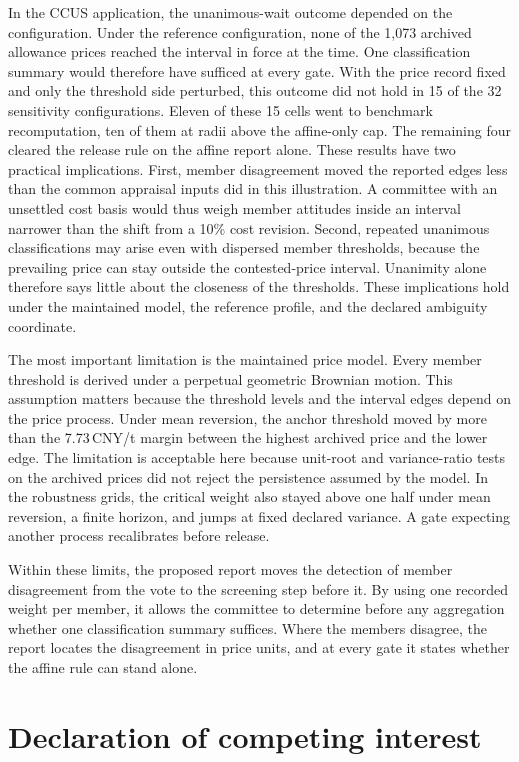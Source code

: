 \documentclass[5p,times,authoryear]{elsarticle}
\theoremstyle{plain}
\begin{document}
In the CCUS application, the unanimous-wait outcome depended on the configuration. Under the reference configuration, none of the 1,073 archived allowance prices reached the interval in force at the time. One classification summary would therefore have sufficed at every gate. With the price record fixed and only the threshold side perturbed, this outcome did not hold in 15 of the 32 sensitivity configurations. Eleven of these 15 cells went to benchmark recomputation, ten of them at radii above the affine-only cap. The remaining four cleared the release rule on the affine report alone. These results have two practical implications. First, member disagreement moved the reported edges less than the common appraisal inputs did in this illustration. A committee with an unsettled cost basis would thus weigh member attitudes inside an interval narrower than the shift from a 10\% cost revision. Second, repeated unanimous classifications may arise even with dispersed member thresholds, because the prevailing price can stay outside the contested-price interval. Unanimity alone therefore says little about the closeness of the thresholds. These implications hold under the maintained model, the reference profile, and the declared ambiguity coordinate.

The most important limitation is the maintained price model. Every member threshold is derived under a perpetual geometric Brownian motion. This assumption matters because the threshold levels and the interval edges depend on the price process. Under mean reversion, the anchor threshold moved by more than the 7.73\,CNY/t margin between the highest archived price and the lower edge. The limitation is acceptable here because unit-root and variance-ratio tests on the archived prices did not reject the persistence assumed by the model. In the robustness grids, the critical weight also stayed above one half under mean reversion, a finite horizon, and jumps at fixed declared variance. A gate expecting another process recalibrates before release.

Within these limits, the proposed report moves the detection of member disagreement from the vote to the screening step before it. By using one recorded weight per member, it allows the committee to determine before any aggregation whether one classification summary suffices. Where the members disagree, the report locates the disagreement in price units, and at every gate it states whether the affine rule can stand alone.

\section*{Declaration of competing interest}
\end{document}
